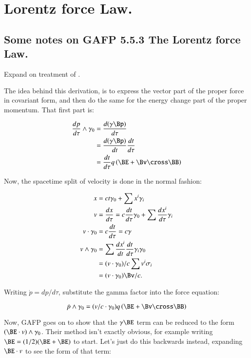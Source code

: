\chapter{Lorentz force Law.}\label{chap:PJSrGAFPLorentzForce}
\date{August 16, 2008}

\section{Some notes on GAFP 5.5.3 The Lorentz force Law.}

Expand on treatment of \citep{doran2003gap}.

The idea behind this derivation, is to express the vector part of the proper force in covariant form, and then
do the same for the energy change part of the proper momentum.  That first part is:

\begin{align*}
\frac{dp}{d\tau} \wedge \gamma_0
&= \frac{d (\gamma \Bp)}{d\tau} \\
&= \frac{d (\gamma \Bp)}{dt} \frac{dt}{d\tau} \\
&= \frac{dt}{d\tau} q \left( \BE + \Bv \cross \BB \right)
\end{align*}

Now, the spacetime split of velocity is done in the normal fashion:

\begin{align*}
x &= c t \gamma_0 + \sum x^i \gamma_i \\
v &= \frac{dx}{d\tau} = c \frac{dt}{d\tau} \gamma_0 + \sum \frac{dx^i}{d\tau} \gamma_i \\
v \cdot \gamma_0 &= c \frac{dt}{d\tau} = c \gamma \\
v \wedge \gamma_0
&= \sum \frac{dx^i}{dt} \frac{dt}{d\tau} \gamma_i \gamma_0 \\
&= (v \cdot \gamma_0)/c \sum v^i \sigma_i \\
&= (v \cdot \gamma_0) \Bv/c.
\end{align*}

Writing $\dot{p} = dp/d\tau$, substitute the gamma factor into the force equation:

\begin{equation*}
\dot{p} \wedge \gamma_0 = ( v/c \cdot \gamma_0 ) q \left( \BE + \Bv \cross \BB \right)
\end{equation*}

Now, GAFP goes on to show that the $\gamma \BE$ term can be reduced to the form $(\BE \cdot v) \wedge \gamma_0$.  Their
method isn't exactly obvious, for example writing $\BE = (1/2)(\BE + \BE)$ to start.  Let's just do this backwards
instead, expanding $\BE \cdot v$ to see the form of that term:

